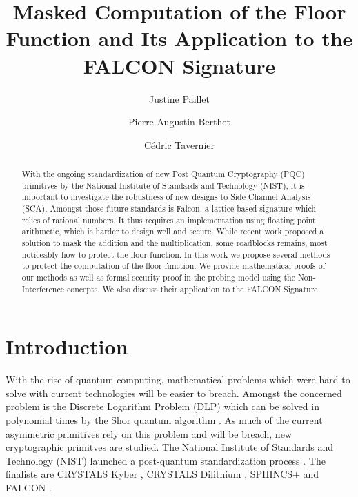 \documentclass[runningheads]{llncs}
\begin{document}
%
\title{Masked Computation of the Floor Function and Its Application to the FALCON Signature}
%
%
\author{Justine Paillet \and
  Pierre-Augustin Berthet \and
C\'edric Tavernier}
%
%
%
\maketitle              %
%
\begin{abstract}
With the ongoing standardization of new Post Quantum Cryptography (PQC) primitives by the National Institute of Standards and Technology (NIST), it is important to investigate the robustness of new designs to Side Channel Analysis (SCA). Amongst those future standards is Falcon, a lattice-based signature which relies of rational numbers. It thus requires an implementation using floating point arithmetic, which is harder to design well and secure. While recent work proposed a solution to mask the addition and the multiplication, some roadblocks remains, most noticeably how to protect the floor function. In this work we propose several methods to protect the computation of the floor function. We provide mathematical proofs of our methods as well as formal security proof in the probing model using the Non-Interference concepts. We also discuss their application to the FALCON Signature.

\end{abstract}
%
%
%
\section{Introduction}
With the rise of quantum computing, mathematical problems which were hard to solve with current technologies will be easier to breach. Amongst the concerned problem is the Discrete Logarithm Problem (DLP) which can be solved in polynomial times by the Shor quantum algorithm \cite{doi:10.1137/S0036144598347011}. As much of the current asymmetric primitives rely on this problem and will be breach, new cryptographic primitves are studied. The National Institute of Standards and Technology (NIST) launched a post-quantum standardization process \cite{chen2016report}. The finalists are CRYSTALS Kyber \cite{8406610,nistfips203mlkem}, CRYSTALS Dilithium \cite{Ducas_Kiltz_Lepoint_Lyubashevsky_Schwabe_Seiler_Stehlé_2018,nistfips204mldsa}, SPHINCS+ \cite{10.1145/3319535.3363229,nistfips205shdsa} and FALCON \cite{prest2020falcon}.
\end{document}
